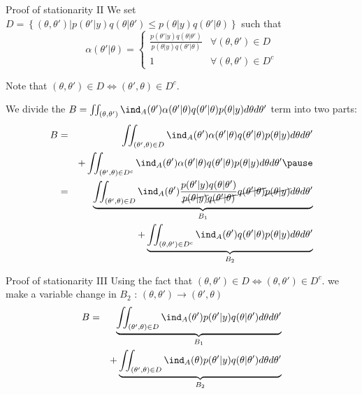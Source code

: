 \begin{frame}[allowframebreaks]{Proof of stationarity II}
We set 
$D  = \left\{(\theta,\theta') | p(\theta'|y) q(\theta|\theta') \leq p(\theta|y) q(\theta'|\theta)\right\}$
such that
$$
 \alpha(\theta' | \theta)  = \left\{
 \begin{array}{ll}
  \frac{ p(\theta'|y) q(\theta|\theta')}{p(\theta|y) q(\theta'|\theta)} & \forall(\theta,\theta') \in D\\
    1 &\forall(\theta,\theta') \in D^c
 \end{array}
 \right.
$$

 Note that $(\theta,\theta')\in D \Leftrightarrow (\theta',\theta)\in D^c$. 

We divide the $B=  \iint_{(\theta,\theta')}\ind_{A}(\theta')   \alpha(\theta' | \theta) q(\theta'|\theta) p(\theta| y) d\theta d\theta'$ term into two parts: 
\begin{eqnarray*}
 B &=& \iint_{(\theta',\theta) \in D }\ind_{A}(\theta')   \alpha(\theta' | \theta) q(\theta'|\theta) p(\theta| y) d\theta d\theta' \\
 && +\iint_{(\theta',\theta) \in D^c }\ind_{A}(\theta')   \alpha(\theta' | \theta) q(\theta'|\theta) p(\theta| y) d\theta d\theta'\pause \\
 &=&\underbrace{\iint_{(\theta',\theta) \in D }\ind_{A}(\theta')    \frac{ p(\theta'|y) q(\theta|\theta')}{\cancel{p(\theta|y)} \cancel{q(\theta'|\theta)}} \cancel{q(\theta'|\theta) }\cancel{p(\theta| y)} d\theta d\theta'}_{B_1}
 \\
 && +  \underbrace{\iint_{(\theta,\theta') \in D^c  }\ind_{A}(\theta' ) q(\theta' |\theta) p(\theta | y) d\theta d\theta' }_{B_2}
 \end{eqnarray*}
\end{frame}
\begin{frame}{Proof of stationarity III}
Using the fact that $(\theta,\theta')\in D \Leftrightarrow (\theta,\theta')\in D^c$. 
we make a variable change in $B_2$ : $(\theta,\theta') \rightarrow (\theta',\theta)$
\begin{eqnarray*}
 B &=& \underbrace{\iint_{(\theta',\theta) \in D }\ind_{A}(\theta')  p(\theta'| y)q(\theta|\theta') d\theta d\theta'}_{B_1} \\
 && + \underbrace{\iint_{(\theta',\theta) \in D }\ind_{A}(\theta)  p(\theta'| y) q(\theta |\theta') d\theta d\theta'}_{B_2}
\end{eqnarray*}



\end{frame}

